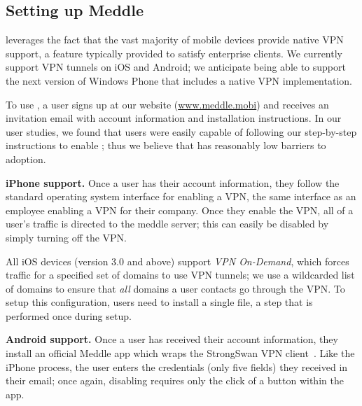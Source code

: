 \subsection{Setting up Meddle}
\meddle leverages the fact that the vast majority of mobile devices provide native VPN support, a feature typically provided to satisfy enterprise clients. We currently support VPN tunnels on iOS and Android; we anticipate being able to support the next version of Windows Phone that includes a native VPN implementation.

To use \meddle, a user signs up at our website (\url{www.meddle.mobi}) and receives an invitation email with account information and installation instructions. In our user studies, we found that users were easily capable of following our step-by-step instructions to enable \meddle; thus we believe that \meddle has reasonably low barriers to adoption. 

\noindent\textbf{iPhone support.} 
Once a user has their account information, they follow the standard operating system interface for enabling a VPN, the same interface as an employee enabling a VPN for their company. Once they enable the VPN, all of a user's traffic is directed to the meddle server; this can easily be disabled by simply turning off the VPN.

All iOS devices (version 3.0 and above) support \textit{VPN On-Demand}, which forces traffic for a specified set of domains to use VPN tunnels; we use a wildcarded list of domains to ensure that {\it all} domains a user contacts go through the VPN. 
To setup this configuration, users need to install a single file, a step that is performed once during setup. 

\noindent\textbf{Android support.} 
Once a user has received their account information, they install an official Meddle app which wraps the StrongSwan VPN client~\cite{strongswanclient}. 
Like the iPhone process, the user enters the credentials (only five fields) they received in their email; once again, disabling \meddle requires only the click of a button within the \meddle app.

